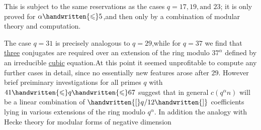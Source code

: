 This is subject to the same reservations as the cases $q=17,19,\text{and }23$; it is only proved for $\alpha\handwritten{\leqslant}5$,and then only by a combination of modular theory and computation.

The case $q=31$ is precisely analogous to $q=29$,while for $q=37$ we find that \uline{three} conjugates are required over an extension of the ring modulo $37^{\alpha}$ defined by an irreducible \uline{cubic}  equation.At this point it seemed unprofitable to compute any further cases in detail, since no essentially new features arose after $29$. However brief preiminary investigations for all primes \uline{$q$} with $41\handwritten{\leqslant}q\handwritten{\leqslant}67$ suggest that in general $c(q^{\alpha}n)$ will be a linear combination of $\handwritten{[}q/12\handwritten{]}$  coefficients lying in various extensions of the ring modulo $q^{\alpha}$. In addition the analogy with Hecke theory for modular forms of negative dimension
